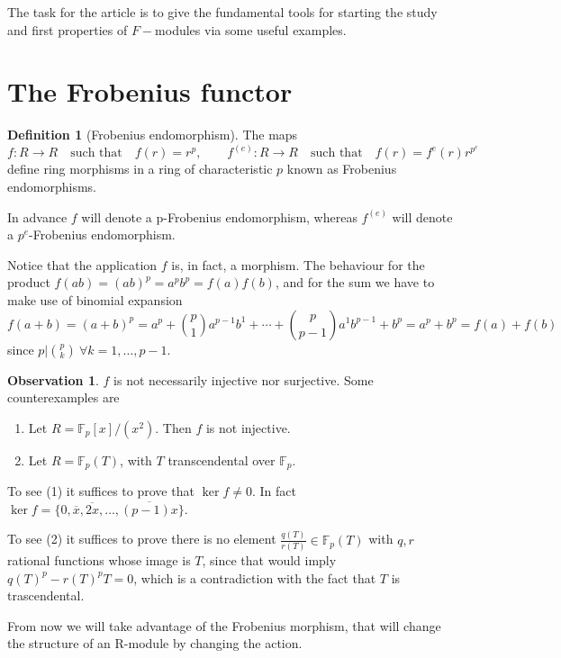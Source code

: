 \documentclass[leqno]{article}
\theoremstyle{definition}
\newtheorem{definition}{Definition}[section]
\newtheorem{observation}{Observation}[section]
\begin{document}
The task for the article is to give the fundamental tools for starting the study and first properties of  $F-$modules via some useful examples.

\section{The Frobenius functor}

\begin{definition}[Frobenius endomorphism] The maps
\[
  f: R \to R \quad \text{such that} \quad f(r) = r^p, \qquad 
  f ^{(e)}: R \to R \quad \text{such that} \quad f(r) = f^e(r) r^{p^e}
\] 
define ring morphisms in a ring of characteristic $p$ known as Frobenius endomorphisms.
\end{definition}

In advance $f$ will denote a p-Frobenius endomorphism, whereas  $f^{(e)}$ will denote a  $p^e$-Frobenius endomorphism.

Notice that the application $f$ is, in fact, a morphism. The behaviour for the product $f(ab)=(ab)^p=a^pb^p=f(a)f(b)$, and for the sum we have to make use of binomial expansion
\[
  f(a+b) = (a+b)^p = a^p + \binom{p}{1} a^{p-1}b^1 + \cdots + \binom{p}{p-1}a^{1}b^{p-1} + b^p = a^p + b^p = f(a) + f(b)
\] 
since $p|\binom{p}{k} \ \forall k=1, \ldots, p-1$.

\begin{observation} $f$ is not necessarily injective nor surjective. Some counterexamples are
   \begin{enumerate}[topsep=-6pt, itemsep=0pt]
	 \item Let $R = \mathbb{F}_p[x] / (x^2)$. Then $f$ is not injective.
	 \item Let  $R = \mathbb{F}_p(T)$, with $T$ transcendental over  $\mathbb{F}_p$.
  \end{enumerate}
\end{observation}

To see (1) it suffices to prove that $\ker f\neq 0$. In fact $\ker f = \{0, \overline{x}, \overline{2x}, \ldots, \overline{(p-1)x}\}$.

To see (2) it suffices to prove there is no element $\frac{q(T)}{r(T)}\in \mathbb{F}_p(T)$ with $q, r$ rational functions whose image is  $T$, since that would imply  $q(T)^p-r(T)^pT = 0$, which is a contradiction with the fact that $T$ is trascendental.

From now we will take advantage of the Frobenius morphism, that will change the structure of an R-module by changing the action.
\end{document}
